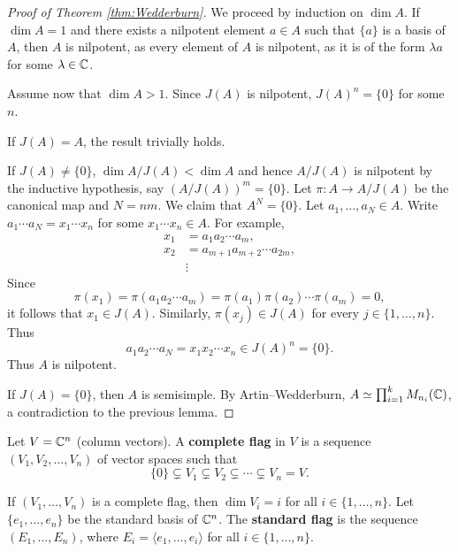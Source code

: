 \begin{proof}[Proof of Theorem \ref{thm:Wedderburn}]
    We proceed by induction on $\dim A$. If $\dim A=1$ and 
    there exists a nilpotent element $a\in A$ such that 
    $\{a\}$ is a basis of $A$, then $A$ is nilpotent, 
    as every element of $A$ is nilpotent, as it is 
    of the form 
    $\lambda a$ for some $\lambda\in\mathbb{C}$. 
    
    Assume now that $\dim A>1$. Since $J(A)$ is nilpotent, $J(A)^n=\{0\}$ 
    for some $n$. 
    
    If $J(A)=A$, the result trivially holds. 

    If $J(A)\ne\{0\}$, 
    $\dim A/J(A)<\dim A$ and hence 
    $A/J(A)$ is nilpotent by 
    the inductive hypothesis, 
    say $(A/J(A))^m=\{0\}$. Let $\pi\colon A\to A/J(A)$ be the canonical map and 
    $N=nm$. We claim that $A^N=\{0\}$. Let $a_1,\dots,a_N\in A$. Write
    $a_1\cdots a_N=x_1\cdots x_n$ for some $x_1\cdots x_n\in A$. For example,
    \begin{align*}
    x_1&=a_1a_2\cdots a_m,\\
    x_2&=a_{m+1}a_{m+2}\cdots a_{2m},\\
    &\vdots
    \end{align*}
    Since 
    \[
    \pi(x_1)=\pi(a_1a_2\cdots a_m)=\pi(a_1)\pi(a_2)\cdots\pi(a_m)=0,
    \]
    it follows that $x_1\in J(A)$. Similarly, 
    $\pi(x_j)\in J(A)$
    for every $j\in\{1,\dots,n\}$. Thus 
    \[
    a_1a_2\cdots a_N=x_1x_2\cdots x_n\in J(A)^n=\{0\}. 
    \]
    Thus $A$ is nilpotent. 

    If $J(A)=\{0\}$, then 
    $A$ is semisimple. By Artin--Wedderburn, 
    $A\simeq\prod_{i=1}^k M_{n_i}(\mathbb{C})$, a contradiction to 
    the previous lemma. 
\end{proof}

\begin{definition}
    Let $V=\mathbb{C}^{n}$ (column vectors). A \textbf{complete flag} in $V$ 
    is a sequence $(V_1,V_2,\dots,V_n)$ of vector spaces
    such that 
    \[
    \{0\}\subsetneq V_1\subsetneq V_2\subsetneq\cdots\subsetneq V_n=V.
    \]
\end{definition}

If $(V_1,\dots,V_n)$ is a complete flag, then $\dim V_i=i$ for all 
$i\in\{1,\dots,n\}$. 
Let $\{e_1,\dots,e_n\}$ be the standard basis of $\mathbb{C}^n$. 
The \textbf{standard flag} is the sequence $(E_1,\dots,E_n)$, where
$E_i=\langle e_1,\dots,e_i\rangle$ for all $i\in\{1,\dots,n\}$.  

